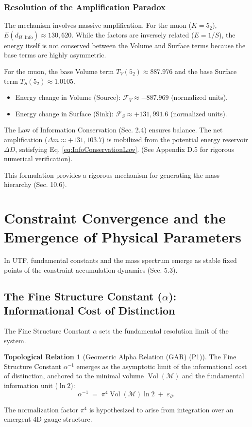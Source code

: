 \documentclass[11pt, a4paper]{article}
\theoremstyle{definition}
\newtheorem{identity}{Topological Relation}[section]
\theoremstyle{definition}
\newcommand{\M}{\mathcal{M}}
\newcommand{\Vol}{\operatorname{Vol}}
\newcommand{\Veight}{\Vol(\M)}
\newcommand{\dHInfo}{d_{H,\mathrm{Info}}} %
\newcommand{\Fv}{\mathcal{F}_V} %
\newcommand{\Fs}{\mathcal{F}_S} %
\newcommand{\Azero}{\pi^4 \Veight \ln 2}
\begin{document}
\subsubsection{Resolution of the Amplification Paradox}
\label{sec:AmplificationParadox}

The mechanism involves massive amplification. For the muon ($K=5_2$), $E(\dHInfo) \approx 130,620$. While the factors are inversely related ($E=1/S$), the energy itself is not conserved between the Volume and Surface terms because the base terms are highly asymmetric.

For the muon, the base Volume term $T_V(5_2) \approx 887.976$ and the base Surface term $T_S(5_2) \approx 1.0105$.

\begin{itemize}
    \item Energy change in Volume (Source): $\Fv \approx -887.969$ (normalized units).
    \item Energy change in Surface (Sink): $\Fs \approx +131,991.6$ (normalized units).
\end{itemize}
The Law of Information Conservation (Sec. 2.4) ensures balance. The net amplification ($\Delta m \approx +131,103.7$) is mobilized from the potential energy reservoir $\Delta D$, satisfying Eq. \eqref{eq:InfoConservationLaw}. (See Appendix D.5 for rigorous numerical verification).

This formulation provides a rigorous mechanism for generating the mass hierarchy (Sec. 10.6).

\section{Constraint Convergence and the Emergence of Physical Parameters}

In UTF, fundamental constants and the mass spectrum emerge as stable fixed points of the constraint accumulation dynamics (Sec. 5.3).

\subsection{The Fine Structure Constant (\texorpdfstring{$\alpha$}{alpha}): Informational Cost of Distinction}

The Fine Structure Constant $\alpha$ sets the fundamental resolution limit of the system.

\begin{identity}[Geometric Alpha Relation (GAR) (P1)]
The Fine Structure Constant $\alpha^{-1}$ emerges as the asymptotic limit of the informational cost of distinction, anchored to the minimal volume $\Veight$ and the fundamental information unit ($\ln 2$):
\begin{equation}
  \alpha^{-1} \;=\; \Azero \;+\; \varepsilon_{\partial}. \label{eq:P1_full}
\end{equation}
\end{identity}
The normalization factor $\pi^4$ is hypothesized to arise from integration over an emergent 4D gauge structure.
\end{document}
